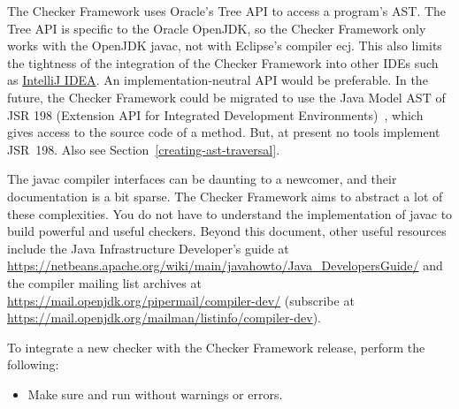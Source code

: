The Checker Framework uses Oracle's Tree API to access a program's AST\@.
The Tree API is specific to the Oracle OpenJDK, so the Checker Framework only
works with the OpenJDK javac, not with Eclipse's compiler ecj.
This also limits the tightness of
the integration of the Checker Framework into other IDEs such as \href{https://www.jetbrains.com/idea/}{IntelliJ IDEA}\@.
An implementation-neutral API would be preferable.
In the future, the Checker Framework
could be migrated to use the Java Model AST of JSR 198 (Extension API for
Integrated Development Environments)~\cite{JSR198}, which gives access to
the source code of a method.  But, at present no tools
implement JSR~198.  Also see Section~\ref{creating-ast-traversal}.




The javac compiler interfaces can be daunting to a
newcomer, and their documentation is a bit sparse. The Checker Framework
aims to abstract a lot of these complexities.
You do not have to understand the implementation of javac to
build powerful and useful checkers.
Beyond this document,
other useful resources include the Java Infrastructure
Developer's guide at
\url{https://netbeans.apache.org/wiki/main/javahowto/Java_DevelopersGuide/} and the compiler
mailing list archives at
\url{https://mail.openjdk.org/pipermail/compiler-dev/}
(subscribe at
\url{https://mail.openjdk.org/mailman/listinfo/compiler-dev}).




To integrate a new checker with the Checker Framework release, perform
the following:

\begin{itemize}

\item Make sure  and  run
without warnings or errors.

\end{itemize}


